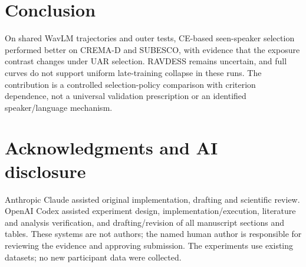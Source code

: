 \documentclass[letterpaper]{article}
\begin{document}
\section{Conclusion}
On shared WavLM trajectories and outer tests, CE-based seen-speaker selection performed better on CREMA-D and SUBESCO, with evidence that the exposure contrast changes under UAR selection. RAVDESS remains uncertain, and full curves do not support uniform late-training collapse in these runs. The contribution is a controlled selection-policy comparison with criterion dependence, not a universal validation prescription or an identified speaker/language mechanism.

\section{Acknowledgments and AI disclosure}
Anthropic Claude assisted original implementation, drafting and scientific review. OpenAI Codex assisted experiment design, implementation/execution, literature and analysis verification, and drafting/revision of all manuscript sections and tables. These systems are not authors; the named human author is responsible for reviewing the evidence and approving submission. The experiments use existing datasets; no new participant data were collected.
\end{document}
